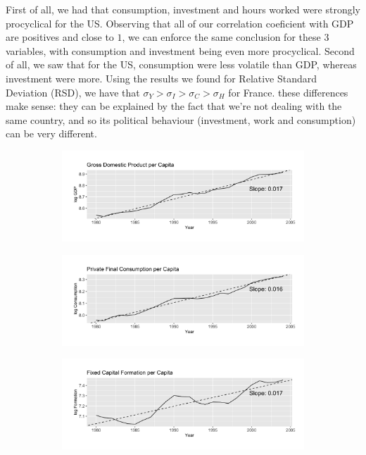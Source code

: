 \documentclass[12pt]{article}
\begin{document}
First of all, we had that consumption, investment and hours worked were strongly procyclical for the US. 
Observing that all of our correlation coeficient with GDP are positives and close to $1$, we can enforce the same conclusion for these $3$ variables, with consumption and investment being even more procyclical.
\newline    
Second of all, we saw that for the US, consumption were less volatile than GDP, whereas investment were more.
Using the results we found for Relative Standard Deviation (RSD), we have that $\sigma_Y > \sigma_I > \sigma_C > \sigma_H$ for France. these differences make sense: they can be explained by the fact that we're not dealing with the same country, and so its political behaviour (investment, work and consumption) can be very different.


\begin{figure}
    \centering
    \begin{subfigure}[b]{1\textwidth}
        \includegraphics[width=\textwidth]{OUTPUT/MEDIA/loggdp_pc.png}
    \end{subfigure}
    \vspace{-20pt}
    \begin{subfigure}[b]{1\textwidth}
        \includegraphics[width=\textwidth]{OUTPUT/MEDIA/logcons_pc.png}
    \end{subfigure}
    \vspace{-20pt}
    \begin{subfigure}[b]{1\textwidth}
        \includegraphics[width=\textwidth]{OUTPUT/MEDIA/loginv_pc.png}

\end{subfigure}
\end{figure}
\end{document}
